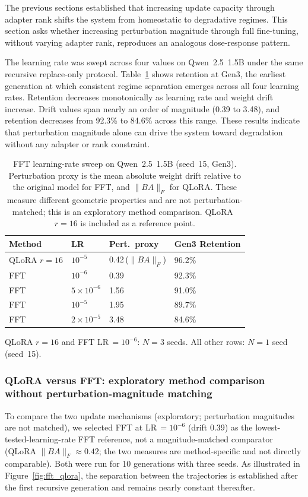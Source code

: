 \documentclass[a4paper,fleqn]{cas-dc}
\newif\ifshowchanges
\newcommand{\rev}[1]{\ifshowchanges{\color{blue}#1}\else{#1}\fi}
\begin{document}
The previous sections established that increasing update capacity through adapter
rank shifts the system from homeostatic to degradative regimes. This section asks
whether increasing perturbation magnitude through full fine-tuning, without
varying adapter rank, reproduces an analogous dose-response pattern.

The learning rate was swept across four values on Qwen~2.5~1.5B under the same
recursive replace-only protocol. Table~\ref{tab:fft_sweep} shows retention
at Gen3, the earliest generation at which consistent regime separation emerges across
all four learning rates. Retention decreases monotonically as learning rate and weight drift increase. Drift
values span nearly an order of magnitude (0.39 to 3.48), and retention decreases
from 92.3\% to 84.6\% across this range. These results indicate that
perturbation magnitude alone can drive the system toward degradation without any
adapter or rank constraint.

\begin{table}[width=.95\linewidth,cols=4,pos=htbp]
\caption{FFT learning-rate sweep on Qwen~2.5~1.5B (seed~15, Gen3). Perturbation
proxy is the mean absolute weight drift relative to the original model for FFT,
and $\|BA\|_F$ for QLoRA. \rev{These measure different geometric properties and are not perturbation-matched; this is an exploratory method comparison.} QLoRA~$r=16$ is included as a reference
point.}\label{tab:fft_sweep}
\begin{tabular*}{\tblwidth}{@{} llll@{} }
\toprule
Method & LR & Pert.\ proxy & Gen3 Retention \\
\midrule
QLoRA $r=16$ & $10^{-5}$          & 0.42\,($\|BA\|_F$) & 96.2\% \\
FFT          & $10^{-6}$          & 0.39               & 92.3\% \\
FFT          & $5{\times}10^{-6}$ & 1.56               & 91.0\% \\
FFT          & $10^{-5}$          & 1.95               & 89.7\% \\
FFT          & $2{\times}10^{-5}$ & 3.48               & 84.6\% \\
\bottomrule
\end{tabular*}
\rev{{\footnotesize QLoRA $r=16$ and FFT LR\,$=10^{-6}$: $N=3$ seeds. All other rows: $N=1$ seed (seed~15).}}
\end{table}

\subsubsection{QLoRA versus FFT: exploratory method comparison without perturbation-magnitude matching}
\rev{To compare the two update mechanisms (exploratory; perturbation magnitudes are not matched), we selected FFT at}
LR$\,=10^{-6}$ (drift 0.39) as \rev{the lowest-tested-learning-rate FFT reference, not a magnitude-matched comparator} (QLoRA $\|BA\|_F \approx 0.42$; \rev{the two measures are method-specific and not directly comparable}). Both were run for 10 generations with three seeds.
As illustrated in Figure~\ref{fig:fft_qlora}, the separation between the
trajectories is established after the first recursive generation and remains
nearly constant thereafter.
\end{document}

